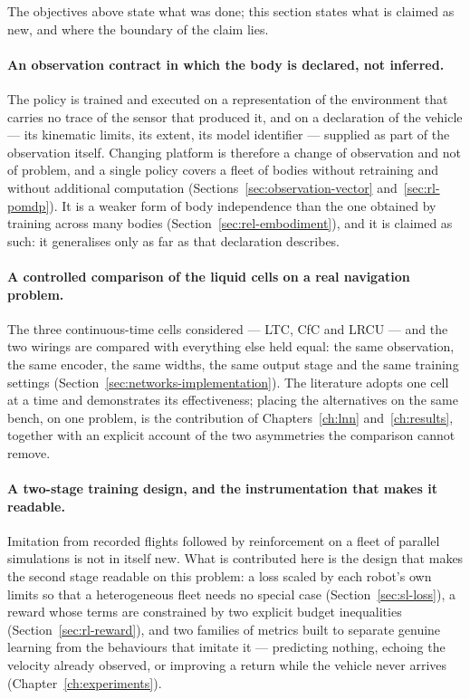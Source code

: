 The objectives above state what was done; this section states what is claimed as
new, and where the boundary of the claim lies.

\paragraph{An observation contract in which the body is declared, not inferred.}
The policy is trained and executed on a representation of the environment that
carries no trace of the sensor that produced it, and on a declaration of the
vehicle --- its kinematic limits, its extent, its model identifier --- supplied
as part of the observation itself. Changing platform is therefore a change of
observation and not of problem, and a single policy covers a fleet of bodies
without retraining and without additional computation
(Sections~\ref{sec:observation-vector} and~\ref{sec:rl-pomdp}). It is a weaker
form of body independence than the one obtained by training across many bodies
(Section~\ref{sec:rel-embodiment}), and it is claimed as such: it generalises
only as far as that declaration describes.

\paragraph{A controlled comparison of the liquid cells on a real navigation
problem.}
The three continuous-time cells considered --- LTC, CfC and LRCU --- and the two
wirings are compared with everything else held equal: the same observation, the
same encoder, the same widths, the same output stage and the same training
settings (Section~\ref{sec:networks-implementation}). The literature adopts one
cell at a time and demonstrates its effectiveness; placing the alternatives on
the same bench, on one problem, is the contribution of Chapters~\ref{ch:lnn}
and~\ref{ch:results}, together with an explicit account of the two asymmetries
the comparison cannot remove.

\paragraph{A two-stage training design, and the instrumentation that makes it
readable.}
Imitation from recorded flights followed by reinforcement on a fleet of parallel
simulations is not in itself new. What is contributed here is the design that
makes the second stage readable on this problem: a loss scaled by each robot's
own limits so that a heterogeneous fleet needs no special case
(Section~\ref{sec:sl-loss}), a reward whose terms are constrained by two
explicit budget inequalities (Section~\ref{sec:rl-reward}), and two families of
metrics built to separate genuine learning from the behaviours that imitate it
--- predicting nothing, echoing the velocity already observed, or improving a
return while the vehicle never arrives (Chapter~\ref{ch:experiments}).

